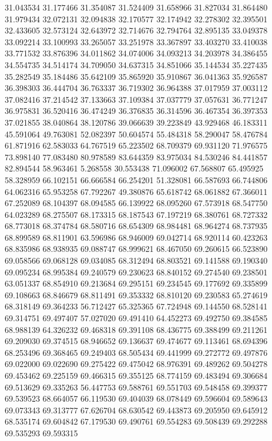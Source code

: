 31.043534
31.177466
31.354087
31.524409
31.658966
31.827034
31.864480
31.979434
32.072131
32.094838
32.170577
32.174942
32.278302
32.395501
32.433605
32.573124
32.643972
32.714676
32.794764
32.895135
33.049378
33.092214
33.100993
33.265057
33.251978
33.367897
33.403270
33.410038
33.771532
33.876396
34.011862
34.074006
34.093213
34.203978
34.386455
34.554735
34.514174
34.709050
34.637315
34.851066
35.144534
35.227435
35.282549
35.184486
35.642109
35.865920
35.910867
36.041363
35.926587
36.398303
36.444704
36.763337
36.719302
36.964388
37.017959
37.003112
37.082416
37.214542
37.133663
37.109384
37.037779
37.057631
36.771247
36.975831
36.520416
36.474249
36.376835
36.314596
36.467354
36.397353
37.021855
38.040864
38.120786
39.066639
39.223849
43.929468
46.183311
45.591064
49.763081
52.082397
50.604574
55.484318
58.290047
58.476784
61.871916
62.583033
64.767519
65.223502
68.709379
69.931120
71.976575
73.898140
77.083480
80.978589
83.644359
83.975034
84.530246
84.441857
82.894544
58.963461
5.268558
30.553438
71.096002
67.568807
65.495925
58.328959
66.102151
66.666584
66.254201
51.328081
66.587693
66.744806
64.062316
65.953258
67.792267
49.380876
65.618742
68.061882
67.366011
67.252089
68.104397
68.094585
66.139922
68.095260
67.573918
68.547750
64.023289
68.275507
68.173315
68.187543
67.197219
68.380761
68.727332
68.773018
68.374784
68.580716
68.654309
68.984481
68.964274
68.737935
68.899589
68.811901
63.596986
68.946009
69.042714
68.920114
60.423263
68.835986
68.938935
69.088747
68.999621
68.467050
69.260615
66.523890
69.058566
69.068128
69.034085
68.312494
68.803521
69.141588
69.190340
69.095234
68.995384
69.240579
69.230623
68.840152
69.274540
69.238501
63.051337
68.854910
69.213684
69.295151
69.234545
69.177692
69.335899
69.108663
68.846679
68.811491
69.353332
68.810120
69.230583
65.274619
68.318149
69.364233
56.712427
65.325365
67.724948
69.144550
68.528141
69.314751
69.497407
57.027020
69.491410
64.452273
69.492750
69.384585
68.988139
64.326232
69.468318
69.391108
68.436775
69.388499
69.211261
69.209030
69.374515
68.946652
69.136637
69.474677
69.113461
68.694396
68.253496
69.368465
69.249403
68.505434
69.441999
69.272772
69.497876
69.022000
69.022690
69.275422
69.475042
68.976391
69.489262
69.504278
69.453462
69.225159
69.466315
69.355125
68.774159
69.483494
69.306684
69.513629
69.335263
56.447753
69.588761
69.551703
69.548458
69.399377
69.539523
68.664057
66.119530
69.404039
68.078449
69.596604
69.589643
69.073343
69.313777
67.626704
68.630542
69.443873
69.205950
69.645912
68.535174
69.604842
67.179530
69.490761
69.554283
69.508439
69.292288
69.535293
69.593315
